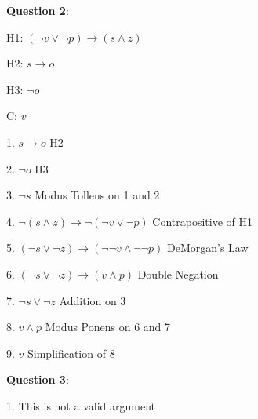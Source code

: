 \documentclass{article} %
\newcommand{\question}[2][]{\begin{flushleft}
        \textbf{Question #1}: \textit{#2}

\end{flushleft}}
\begin{document}
                                                                   

    \question[2]{}

    H1: $(\neg v \lor \neg p) \rightarrow (s \land z)$
    
    H2: $s \rightarrow o$
    
    H3: $\neg o$
    
    C: $v$

    \hspace*{0cm}

    1. $s \rightarrow o$ \tabto*{5cm}H2

    2. $\neg o$ \tabto*{5cm}H3

    3. $\neg s$ \tabto*{5cm}Modus Tollens on 1 and 2

    4. $\neg (s \land z) \rightarrow \neg (\neg v \lor \neg p)$ \tabto*{5cm}Contrapositive of H1

    5. $(\neg s \lor \neg z) \rightarrow (\neg \neg v \land \neg \neg p)$ \tabto*{5cm}DeMorgan's Law

    6. $(\neg s \lor \neg z) \rightarrow (v \land p)$ \tabto*{5cm}Double Negation

    7. $\neg s \lor \neg z$ \tabto*{5cm}Addition on 3

    8. $v \land p$ \tabto*{5cm}Modus Ponens on 6 and 7

    9. $v$ \tabto*{5cm}Simplification of 8
    

    \newpage


    \question[3]{}

    1. This is not a valid argument 
    
\end{document}
